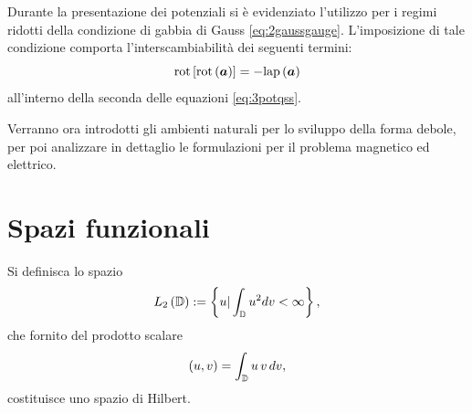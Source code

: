 Durante la presentazione dei potenziali si è evidenziato l'utilizzo per i regimi ridotti della condizione di gabbia di Gauss \eqref{eq:2gaussgauge}. L'imposizione di tale condizione comporta l'interscambiabilità dei seguenti termini:
\begin{equation}
\label{eq:3rotrotlap}
\text{rot}\left[\text{rot}\left(\boldsymbol{a}\right)\right] = -\text{lap}\left(\boldsymbol{a}\right)
\end{equation}
all'interno della seconda delle equazioni \eqref{eq:3potqss}. 

Verranno ora introdotti gli ambienti naturali per lo sviluppo della forma debole, per poi analizzare in dettaglio le formulazioni per il problema magnetico ed elettrico.

\section{Spazi funzionali}

Si definisca lo spazio
\begin{equation}
\label{eq:3L2}
L_2\left(\mathbb{D}\right) := \left\{ u | \int_{\mathbb{D}} u^2 dv < \infty\right\},
\end{equation}
che fornito del prodotto scalare
\begin{equation}
\label{eq:3scaL2}
\left(u,v\right)= \int_{\mathbb{D}} u\,v\, dv,
\end{equation}
costituisce uno spazio di Hilbert.

